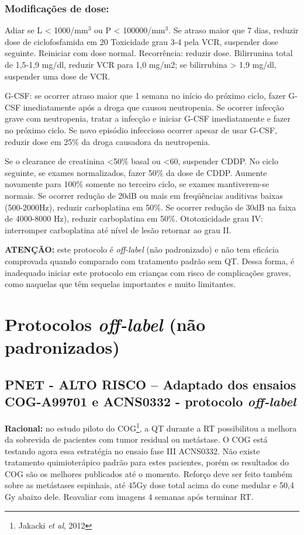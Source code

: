 \documentclass[11pt,a4paper,oldfontcommands]{memoir}
\begin{document}
\subsection{Modificações de dose:}

Adiar se L < 1000/mm\(^3\) ou P < 100000/mm\(^3\). Se atraso maior que 7 dias, reduzir dose de ciclofosfamida em 20%
Toxicidade grau 3-4 pela VCR, suspender dose seguinte. Reiniciar com dose normal. Recorrência: reduzir dose.
Bilirrunina total de 1,5-1,9 mg/dl, reduzir VCR para 1,0 mg/m2; se bilirrubina > 1,9 mg/dl, suspender uma dose de VCR.

G-CSF: se ocorrer atraso maior que 1 semana no início do próximo ciclo, fazer G-CSF imediatamente após a droga que causou neutropenia. Se ocorrer infecção grave com neutropenia, tratar a infecção e iniciar G-CSF imediatamente e fazer no próximo ciclo. Se novo episódio infeccioso ocorrer apesar de usar G-CSF, reduzir dose em 25\% da droga causadora da neutropenia.

Se o clearance de creatinina <50\% basal ou <60, suspender CDDP. No ciclo seguinte, se exames normalizados, fazer 50\% da dose de CDDP. Aumente novamente para 100\% somente no terceiro ciclo, se exames mantiverem-se normais.
Se ocorrer redução de 20dB ou mais em freqüências auditivas baixas (500-2000Hz), reduzir carboplatina em 50\%. Se ocorrer redução de 30dB na faixa de 4000-8000 Hz), reduzir carboplatina em 50\%. Ototoxicidade grau IV: interromper carboplatina até nível de lesão retornar ao grau II.

\textbf{ATENÇÃO:} este protocolo é \textit{off-label} (não padronizado) e não tem eficácia comprovada quando comparado com tratamento padrão sem QT. Dessa forma, é inadequado iniciar este protocolo em crianças com risco de complicações graves, como naquelas que têm sequelas importantes e muito limitantes.
\cleardoublepage
\chapter{Protocolos \textit{off-label} (não padronizados)}

\cleardoublepage

\section{PNET - ALTO RISCO -- Adaptado dos ensaios COG-A99701 e ACNS0332 - protocolo \textit{off-label}}
{\let\thefootnote\relax{}}
\textbf{Racional:} no estudo piloto do COG\footnote{Jakacki \textit{et al}, 2012}, a QT durante a RT possibilitou a melhora da sobrevida de pacientes com tumor residual ou metástase. O COG está testando agora essa estratégia no ensaio fase III ACNS0332. Não existe tratamento quimioterápico padrão para estes pacientes, porém os resultados do COG são os melhores publicados até o momento. Reforço deve ser feito também sobre as metástases espinhais, até 45Gy dose total acima do cone medular e 50,4 Gy abaixo dele. Reavaliar com imagens 4 semanas após terminar RT.
\end{document}
